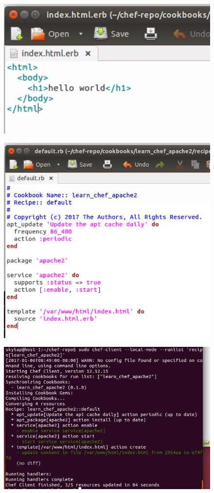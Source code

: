 \documentclass[12pt,letterpaper,boxed]{hmcpset}
\begin{document}
\begin{figure}[H]
  \centering
  \includegraphics[width = 1.0\textwidth]{30.png}
\end{figure}
\begin{figure}[H]
  \centering
  \includegraphics[width = 1.0\textwidth]{31.png}
\end{figure}
\begin{figure}[H]
  \centering
  \includegraphics[width = 1.0\textwidth]{32.png}
\end{figure}
\end{document}
